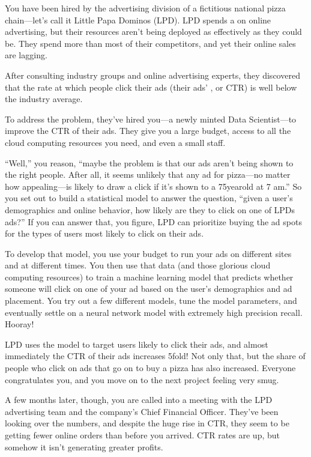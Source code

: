 \documentclass[letterpaper,10pt,english]{jupyterBook}
\begin{document}
\sphinxAtStartPar
You have been hired by the advertising division of a fictitious national pizza chain—let’s call it Little Papa Dominos (LPD). LPD spends a  on online advertising, but their resources aren’t being deployed as effectively as they could be. They spend more than most of their competitors, and yet their online sales are lagging.

\sphinxAtStartPar
After consulting industry groups and online advertising experts, they discovered that the rate at which people click their ads (their ads’ , or CTR) is well below the industry average.

\sphinxAtStartPar
To address the problem, they’ve hired you—a newly minted Data Scientist—to improve the CTR of their ads. They give you a large budget, access to all the cloud computing resources you need, and even a small staff.

\sphinxAtStartPar
“Well,” you reason, “maybe the problem is that our ads aren’t being shown to the right people. After all, it seems unlikely that any ad for pizza—no matter how appealing—is likely to draw a click if it’s shown to a 75\sphinxhyphen{}year\sphinxhyphen{}old at 7 am.” So you set out to build a statistical model to answer the question, “given a user’s demographics and online behavior, how likely are they to click on one of LPDs ads?” If you can answer that, you figure, LPD can prioritize buying the ad spots for the types of users most likely to click on their ads.

\sphinxAtStartPar
To develop that model, you use your budget to run your ads on different sites and at different times. You then use that data (and those glorious cloud computing resources) to train a machine learning model that predicts whether someone will click on one of your ad based on the user’s demographics and ad placement. You try out a few different models, tune the model parameters, and eventually settle on a neural network model with extremely high precision  recall. Hooray!

\sphinxAtStartPar
LPD uses the model to target users likely to click their ads, and almost immediately the CTR of their ads increases 5\sphinxhyphen{}fold! Not only that, but the share of people who click on ads that go on to buy a pizza has also increased. Everyone congratulates you, and you move on to the next project feeling very smug.

\sphinxAtStartPar
A few months later, though, you are called into a meeting with the LPD advertising team and the company’s Chief Financial Officer. They’ve been looking over the numbers, and despite the huge rise in CTR, they seem to be getting fewer online orders than before you arrived. CTR rates are up, but somehow it isn’t generating greater profits.
\end{document}
